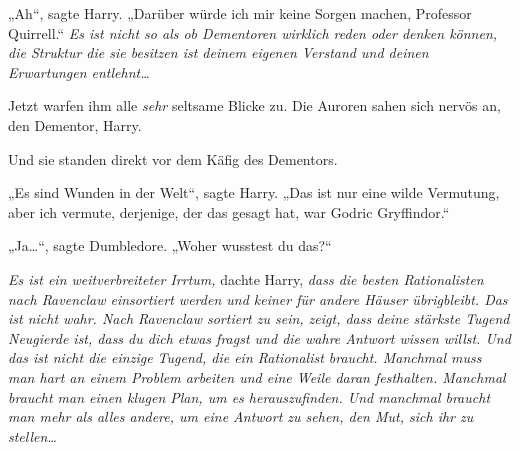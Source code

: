 „Ah“, sagte Harry. „Darüber würde ich mir keine Sorgen machen, Professor Quirrell.“ \emph{Es ist nicht so als ob Dementoren wirklich reden oder denken können, die Struktur die sie besitzen ist deinem eigenen Verstand und deinen Erwartungen entlehnt…}

Jetzt warfen ihm alle \emph{sehr} seltsame Blicke zu. Die Auroren sahen sich nervös an, den Dementor, Harry.

Und sie standen direkt vor dem Käfig des Dementors.

„Es sind Wunden in der Welt“, sagte Harry. „Das ist nur eine wilde Vermutung, aber ich vermute, derjenige, der das gesagt hat, war Godric Gryffindor.“

„Ja…“, sagte Dumbledore. „Woher wusstest du das?“

\emph{Es ist ein weitverbreiteter Irrtum,} dachte Harry, \emph{dass die besten Rationalisten nach Ravenclaw einsortiert werden und keiner für andere Häuser übrigbleibt. Das ist nicht wahr. Nach Ravenclaw sortiert zu sein, zeigt, dass deine stärkste Tugend Neugierde ist, dass du dich etwas fragst und die wahre Antwort wissen willst. Und das ist nicht die \emph{einzige} Tugend, die ein Rationalist braucht. Manchmal muss man hart an einem Problem arbeiten und eine Weile daran festhalten. Manchmal braucht man einen klugen Plan, um es herauszufinden. Und manchmal braucht man mehr als alles andere, um eine Antwort zu sehen, den Mut, sich ihr zu stellen…}


